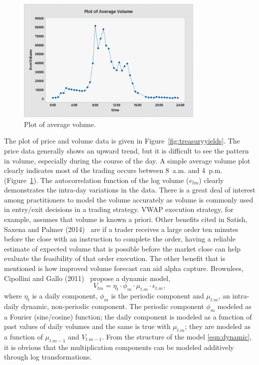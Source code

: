         \begin{figure}[!ht]
        \centering
        \includegraphics[width=0.8\textwidth]{chapters/chapter_stat_ts/figures/avgvol.png}
        \caption{Plot of average volume. \label{fig:averagevolume}}
        \end{figure}


The plot of price and volume data is given in Figure~\ref{fig:treasuryyields}. The price data generally shows an upward trend, but it is difficult to see the pattern in volume, especially during the course of the day. A simple average volume plot clearly indicates most of the trading occurs between 8~a.m. and 4~p.m. (Figure~\ref{fig:averagevolume}). The autocorrelation function of the log volume ($v_{tm}$) clearly demonstrates the intra-day variations in the data. There is a great deal of interest among practitioners to model the volume accurately as volume is commonly used in entry/exit decisions in a trading strategy. VWAP execution strategy, for example, assumes that volume is known a priori. Other benefits cited in Satish, Saxena and Palmer (2014)~\cite{satish} are if a trader receives a large order ten minutes before the close with an instruction to complete the order, having a reliable estimate of expected volume that is possible before the market close can help evaluate the feasibility of that order execution. The other benefit that is mentioned is how improved volume forecast can aid alpha capture. Brownlees, Cipollini and Gallo (2011)~\cite{brownless} propose a dynamic model,
	\begin{equation} \label{eqn:dynamic}
	V_{tm}= \eta_t \cdot \phi_m \cdot \mu_{t.m} \cdot \epsilon_{t.m},
	\end{equation}
where $\eta_t$ is a daily component, $\phi_m$ is the periodic component and $\mu_{t.m}$, an intra-daily dynamic, non-periodic component. The periodic component $\phi_m$ modeled as a Fourier (sine/cosine) function; the daily component is modeled as a function of past values of daily volumes and the same is true with $\mu_{t.m}$; they are modeled as a function of $\mu_{t.m-1}$ and $V_{t.m-1}$. From the structure of the model \eqref{eqn:dynamic}, it is obvious that the multiplication components can be modeled additively through log transformations.


